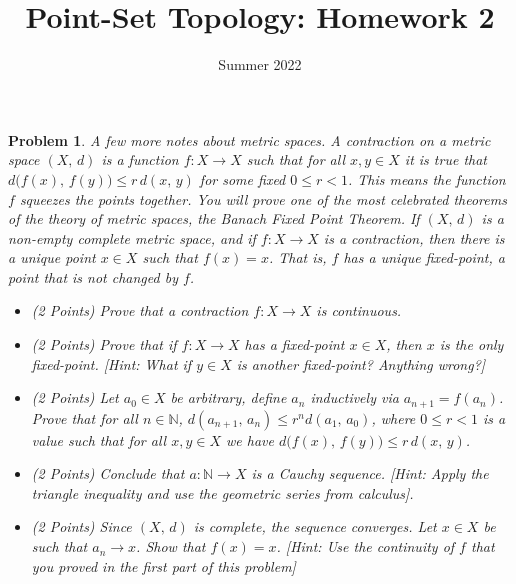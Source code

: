 \documentclass{article}
\title{Point-Set Topology: Homework 2}
\date{Summer 2022}
\theoremstyle{normal}
\newtheorem{problem}{Problem}
\begin{document}
    \maketitle
    \color{blue}
    \begin{problem}
        A few more notes about metric spaces. A \textit{contraction} on a
        metric space $(X,\,d)$ is a function $f:X\rightarrow{X}$ such that
        for all $x,y\in{X}$ it is true that
        $d\big(f(x),\,f(y)\big)\leq{r}\,d(x,\,y)$ for some fixed $0\leq{r}<1$.
        This means the function $f$ \textit{squeezes} the points together.
        You will prove one of the most celebrated theorems of the theory of
        metric spaces, the \textit{Banach Fixed Point Theorem}.
        If $(X,\,d)$ is a non-empty complete metric space, and if
        $f:X\rightarrow{X}$ is
        a contraction, then there is a unique point $x\in{X}$ such that
        $f(x)=x$. That is, $f$ has a unique \textit{fixed-point}, a point that
        is not changed by $f$.
        \begin{itemize}
            \item (2 Points) Prove that a contraction $f:X\rightarrow{X}$ is
                continuous.
            \item (2 Points) Prove that if $f:X\rightarrow{X}$ has a
                fixed-point $x\in{X}$, then $x$ is the only fixed-point.
                [Hint: What if $y\in{X}$ is another fixed-point?
                Anything wrong?]
            \item (2 Points) Let $a_{0}\in{X}$ be arbitrary, define $a_{n}$
                inductively via $a_{n+1}=f(a_{n})$. Prove that for all
                $n\in\mathbb{N}$,
                $d(a_{n+1},\,a_{n})\leq{r}^{n}d(a_{1},\,a_{0})$, where
                $0\leq{r}<1$ is a value such that for all
                $x,y\in{X}$ we have
                $d\big(f(x),\,f(y)\big)\leq{r}\,d(x,\,y)$.
            \item (2 Points) Conclude that $a:\mathbb{N}\rightarrow{X}$ is a
                Cauchy sequence. [Hint: Apply the triangle inequality and use
                the geometric series from calculus].
            \item (2 Points) Since $(X,\,d)$ is complete, the sequence
            converges. Let $x\in{X}$ be such that
            $a_{n}\rightarrow{x}$. Show that $f(x)=x$.
            [Hint: Use the continuity of $f$ that you proved in the first part
            of this problem]
        \end{itemize}
    \end{problem}
\end{document}
